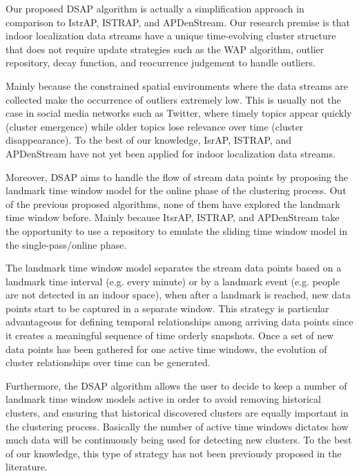 Our proposed DSAP algorithm is actually a simplification approach in comparison to IstrAP, ISTRAP, and APDenStream. Our research premise is that indoor localization data streams have a unique time-evolving cluster structure that does not require update strategies such as the WAP algorithm, outlier repository, decay function, and reocurrence judgement to handle outliers. 

Mainly because the constrained spatial environments where the data streams are collected make the occurrence of outliers extremely low. This is usually not the case in social media networks such as Twitter, where timely topics appear quickly (cluster emergence) while older topics lose relevance over time (cluster disappearance). To the best of our knowledge, IsrAP, ISTRAP, and APDenStream have not yet been applied for indoor localization data streams. 

Moreover, DSAP aims to handle the flow of stream data points by proposing the landmark time window model for the online phase of the clustering process. Out of the previous proposed algorithms, none of them have explored the landmark time window before. Mainly because ItsrAP, ISTRAP, and APDenStream take the opportunity to use a repository to emulate the sliding time window model in the single-pass/online phase. 

The landmark time window model separates the stream data points based on a landmark time interval (e.g. every minute) or by a landmark event (e.g. people are not detected in an indoor space), when after a landmark is reached, new data points start to be captured in a separate window. This strategy is particular advantageous for defining temporal relationships among arriving data points since it creates a meaningful sequence of time orderly snapshots. Once a set of new data points has been gathered for one active time windows, the evolution of cluster relationships over time can be generated. 

Furthermore, the DSAP algorithm allows the user to decide to keep a number of landmark time window models active in order to avoid removing historical clusters, and ensuring that historical discovered clusters are equally important in the clustering process. Basically the number of active time windows dictates how much data will be continuously being used for detecting new clusters. To the best of our knowledge, this type of strategy has not been previously proposed in the literature.






